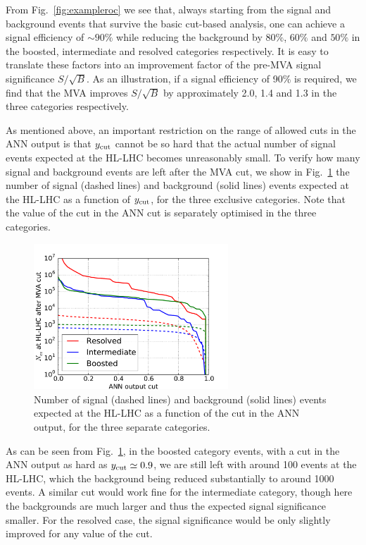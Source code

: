 From Fig.~\ref{fig:exampleroc} we see that, always starting from the signal
and background events that survive the basic cut-based analysis,
one can achieve a  signal
efficiency of $\sim 90\%$ while reducing the background by
$80\%$, $60\%$ and $50\%$ in the boosted, intermediate and resolved
categories respectively.
%
It is easy to translate these factors into an  improvement factor of the pre-MVA
signal significance $S/\sqrt{B}$.
%
As an illustration, if a signal efficiency of 90\%
is required, we find that the MVA improves $S/\sqrt{B}$
by  approximately 2.0, 1.4 and 1.3  in the three categories respectively.

As mentioned above, an
 important restriction on the range of allowed cuts in the ANN output
 is that $y_{\rm cut}$
 cannot be so hard that the actual number of signal events expected
at the HL-LHC becomes unreasonably small.
%
To verify how many signal and background events are left after the MVA cut,
we show in Fig.~\ref{fig:nev2} the number of signal (dashed lines) and background (solid lines)
  events expected at the HL-LHC as a function of $y_{\rm cut}$,
  for the three exclusive categories.
  Note that the value of the cut in the ANN cut is separately optimised in the three
  categories.

\begin{figure}[t]
\begin{center}
\includegraphics[width=0.65\textwidth]{plots/nev2_noPU.pdf}
\caption{\small Number of signal (dashed lines) and background (solid lines)
  events expected at the HL-LHC as a function of the cut in the ANN output,
  for the three separate categories.
}
\label{fig:nev2}
\end{center}
\end{figure}

As can be seen from Fig.~\ref{fig:nev2}, in the boosted category
events, with a cut in the ANN output as hard as $y_{\rm cut}\simeq 0.9$,
we are still left
with around 100 events at the HL-LHC, 
which the background being reduced substantially to around
1000 events.
%
A similar cut would work fine for the intermediate category, though here
the backgrounds are much larger and thus the expected signal significance smaller.
%
For the resolved case, the signal significance would be only slightly
improved for any value of the cut.

